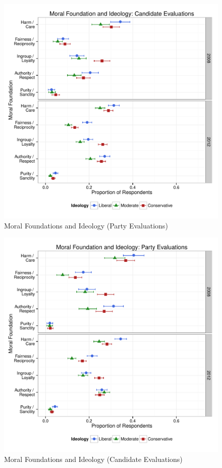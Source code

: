 \documentclass[12pt]{article}
\begin{document}
\begin{figure}\centering
\includegraphics[scale=.6]{../calc/fig/p2_mft_ideol_ca.pdf}
\caption{Moral Foundations and Ideology (Party Evaluations)}\label{fig:mft_ideol_pa}
\end{figure}

\begin{figure}\centering
\includegraphics[scale=.6]{../calc/fig/p3_mft_ideol_pa.pdf}
\caption{Moral Foundations and Ideology (Candidate Evaluations)}\label{fig:mft_ideol_ca}
\end{figure}
\end{document}
